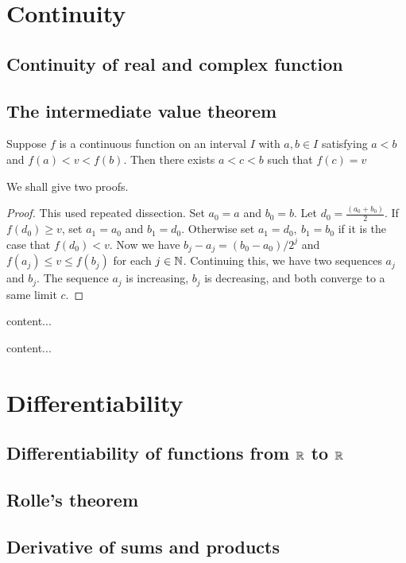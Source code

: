\documentclass[main.tex]{subfiles}
\begin{document}
	
	
	\section{Continuity}
	\subsection{Continuity of real and complex function}
	
	\subsection{The intermediate value theorem}
	\begin{theorem}
		Suppose $f$ is a continuous function on an interval $I$ with $a, b \in I$ satisfying $a < b$ and $f(a) < v < f(b)$. Then there exists $a < c < b$ such that $f(c) = v$
	\end{theorem}
	We shall give two proofs.
	\begin{proof}
		This used repeated dissection. Set $a_0 = a$ and $b_0 = b$. Let $d_0 = \frac{(a_0 + b_0)}{2}$. If $f(d_0) \geq v$, set $a_1 = a_0$ and $b_1 = d_0$. Otherwise set $a_1 = d_0,\ b_1 = b_0$ if it is the case that $f(d_0) < v$.	Now we have $b_j - a_j = (b_0 - a_0)/2^j$ and $f(a_j) \leq v \leq f(b_j)$ for each $j\in\mathbb N$.	Continuing this, we have two sequences $a_j$ and $b_j$. The sequence $a_j$ is increasing, $b_j$ is decreasing, and both converge to a same limit $c$. 
	\end{proof}
	\begin{theorem}
		content...
	\end{theorem}
	\begin{theorem}
		content...
	\end{theorem}

	\section{Differentiability}
	\subsection{Differentiability of functions from $\mathbb R$ to $\mathbb R$}
	\subsection{Rolle's theorem}
	\subsection{Derivative of sums and products}
\end{document}
